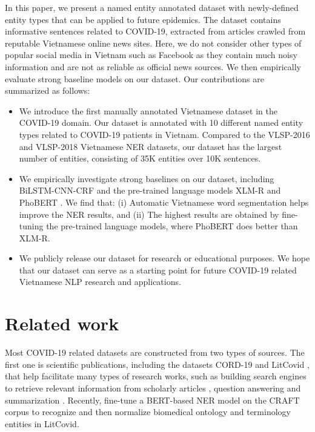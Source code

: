 \documentclass[11pt]{article}
\begin{document}
In this paper, we present a named entity annotated dataset with newly-defined  entity types that can be applied to future epidemics. The dataset contains informative sentences related to COVID-19, extracted from articles crawled from  reputable Vietnamese online news sites. Here, we do not consider other types of popular social media in Vietnam such as Facebook as they contain much noisy information and are not as reliable as official news sources. We then empirically evaluate strong baseline models on our dataset. Our contributions are summarized as follows:

\begin{itemize}\setlength\itemsep{-1pt}

    \item  We introduce the first manually annotated Vietnamese dataset in the  COVID-19 domain. Our dataset is annotated with 10 different named entity types related to COVID-19 patients in Vietnam. Compared to the VLSP-2016 and VLSP-2018 Vietnamese NER datasets, our dataset has the largest number of entities, consisting of 35K entities over 10K sentences. 
    
    \item We empirically investigate strong baselines  on our dataset, including {BiLSTM-CNN-CRF}  \cite{ma2016end} and the pre-trained  language models {XLM-R} \cite{conneau2019unsupervised} and {PhoBERT} \cite{nguyen2020phobert}. We find that: (i) Automatic Vietnamese word segmentation helps improve the NER results, and (ii) The highest results are obtained by fine-tuning the pre-trained language models, where PhoBERT does better than XLM-R.
    
    \item We publicly release our dataset for research or educational purposes. 
We hope that our dataset can serve as a starting point for future COVID-19 related Vietnamese NLP research and applications.
\end{itemize}










\section{Related work}


Most COVID-19 related datasets are constructed from two types of sources. The first one is scientific publications, including the datasets CORD-19  \cite{wang2020cord} and LitCovid \cite{chen2020keep}, that help facilitate many types of research works, such as building search engines to retrieve relevant information from scholarly articles \cite{esteva2020co,zhang2020covidex,verspoor2020covid}, question answering and  summarization   \cite{lee2020answering,dan2020caire}. Recently,  fine-tune a BERT-based NER model on the CRAFT corpus \cite{VerspoorCLWJRCFMEXBBPH12} to recognize and then normalize biomedical ontology and terminology entities in LitCovid. 
\end{document}
